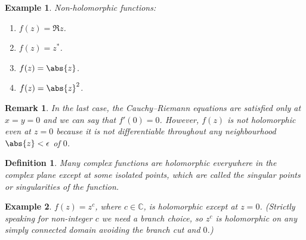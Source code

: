 \documentclass{article}
\theoremstyle{plain}\theoremheaderfont{\normalfont\itshape}\theorembodyfont{\rmfamily}\theoremseparator{.}\newtheorem*{rem}{Remark}\newtheorem*{ex}{Example}\newtheorem*{proof}{Proof}\newtheorem*{altp}{Alternative proof}
\theoremstyle{plain}\theoremheaderfont{\normalfont\bfseries}\theorembodyfont{\rmfamily}\theoremseparator{.}\newtheorem{thm}{Theorem}[section]\newtheorem{lem}[thm]{Lemma}\newtheorem{prop}[thm]{Proposition}\newtheorem*{cor}{Corollary}\newtheorem{defn}[thm]{Definition}\newtheorem{clm}[thm]{Claim}\newtheorem{clminproof}{Claim}
\theoremstyle{break}\theoremheaderfont{\normalfont\itshape}\theorembodyfont{\rmfamily}\theoremseparator{.\medskip}\newtheorem*{proofskip}{Proof}\newtheorem*{exs}{Examples}\newtheorem*{rems}{Remarks}
\theoremstyle{break}\theoremheaderfont{\normalfont\bfseries}\theorembodyfont{\rmfamily}\theoremseparator{.\medskip}\newtheorem{lemskip}[thm]{Lemma}\newtheorem{defnskip}[thm]{Definition}\newtheorem{propskip}[thm]{Proposition}\newtheorem{thmskip}[thm]{Theorem}
\numberwithin{equation}{section}
\begin{document}
	\begin{ex}
		Non-holomorphic functions:
		\begin{enumerate}[topsep=0pt]
			\item \(f(z)=\Re z\).
			\item \(f(z)=z^*\).
			\item \(f(z)=\abs{z}\).
			\item \(f(z)=\abs{z}^2\).
		\end{enumerate}
	\end{ex}
	\begin{rem}
		In the last case, the Cauchy--Riemann equations are satisfied only at \(x=y=0\) and we can say that \(f'(0)=0\). However, \(f(z)\) is not holomorphic even at \(z=0\) because it is not differentiable throughout any neighbourhood \(\abs{z}<\epsilon\) of \(0\).
	\end{rem}
	\begin{defn}
		Many complex functions are holomorphic everywhere in the complex plane except at some isolated points, which are called the \textit{singular points} or \textit{singularities} of the function.
	\end{defn}
	\begin{ex}
		\(f(z)=z^c\), where \(c\in\mathbb{C}\), is holomorphic except at \(z=0\). (Strictly speaking for non-integer \(c\) we need a branch choice, so \(z^c\) is holomorphic on any simply connected domain avoiding the branch cut and \(0\).)
	\end{ex}
\end{document}
